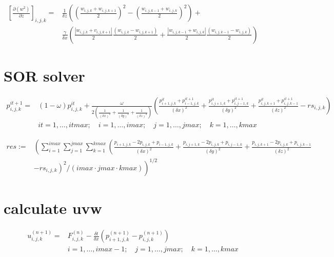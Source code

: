 \documentclass[10pt]{article}
\begin{document}
\begin{equation}
\begin{split}
\left[\frac{\partial(w^2)}{\partial z}\right]_{i,j,k} = &
\frac{1}{\delta z}
\left(
	\left(\frac{w_{i,j,k}+w_{i,j,k+1}}{2}\right)^2 -
	\left(\frac{w_{i,j,k-1}+w_{i,j,k}}{2}\right)^2
\right) + \\
& \frac{\gamma}{\delta x}
\left(
	\frac{|w_{i,j,k}+v_{i,j,k+1}|}{2} \frac{(w_{i,j,k}-w_{i,j,k+1})}{2} +
	\frac{|w_{i,j,k-1}+w_{i,j,k}|}{2} \frac{(w_{i,j,k-1}-w_{i,j,k})}{2}
\right)
\end{split}
\end{equation}


\section{SOR solver}
\begin{equation}
\begin{split}
p^{it+1}_{i,j,k} = & (1 - \omega) p^{it}_{i,j,k} + \frac{\omega}{2 (\frac{1}{(\delta x)^2} + \frac{1}{(\delta y)^2} + \frac{1}{(\delta z)^2})} \left( \frac{p^{it}_{i+1,j,k} + p^{it+1}_{i-1,j,k}}{(\delta x)^2} + \frac{p^{it}_{i,j+1,k} + p^{it+1}_{i,j-1,k}}{(\delta y)^2} + \frac{p^{it}_{i,j,k+1} + p^{it+1}_{i,j,k-1}}{(\delta z)^2} - rs_{i,j,k} \right)\\
& it = 1,\ldots,itmax; \quad i = 1,\ldots,imax; \quad j = 1,\ldots,jmax; \quad k = 1,\ldots,kmax
\end{split}
\end{equation}

\begin{equation}
\begin{split}
res := & \left( \sum_{i=1}^{imax} \sum_{j=1}^{jmax} \sum_{k=1}^{kmax} \left( \frac{p_{i+1,j,k} - 2 p_{i,j,k} + p_{i-1,j,k}}{(\delta x)^2} + \frac{p_{i,j+1,k} - 2 p_{i,j,k} + p_{i,j-1,k}}{(\delta y)^2} + \frac{p_{i,j,k+1} - 2 p_{i,j,k} + p_{i,j,k-1}}{(\delta z)^2} \right. \right. \\
& \left. \left. - rs_{i,j,k} \right)^2 / (imax \cdot jmax \cdot kmax) \right)^{1/2}
\end{split}
\end{equation}

\section{calculate uvw}
\begin{equation}
\begin{split}
u^{(n+1)}_{i,j,k} = & F^{(n)}_{i,j,k} - \frac{\delta t}{\delta x}\left(p^{(n+1)}_{i+1,j,k} - p^{(n+1)}_{i,j,k}\right)\\
& i = 1,\ldots,imax-1; \quad j = 1,\ldots,jmax; \quad k = 1,\ldots,kmax
\end{split}
\end{equation}
\end{document}

